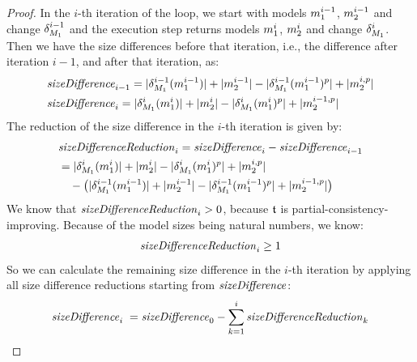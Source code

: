 \begin{proof}
    In the $i$-th iteration of the loop, we start with models $\model{m}{1}^{i-1}$, $\model{m}{2}^{i-1}$ and change $\change{\metamodel{M}{1}}^{i-1}$ and the execution step returns models $\model{m}{1}^{i}$, $\model{m}{2}^{i}$ and change $\change{\metamodel{M}{1}}^{i}$.
    Then we have the size differences before that iteration, i.e., the difference after iteration $i-1$, and after that iteration, as:
    \begin{align*}
        &
        \mathvariable{sizeDifference}_{i-1} = \abs{\change{\metamodel{M}{1}}^{i-1}(\model{m}{1}^{i-1})} + \abs{\model{m}{2}^{i-1}} - \abs{\change{\metamodel{M}{1}}^{i-1}(\model{m}{1}^{i-1})^p} + \abs{\model{m}{2}^{i, p}} \\
        &
        \mathvariable{sizeDifference}_{i} = \abs{\change{\metamodel{M}{1}}^{i}(\model{m}{1}^{i})} + \abs{\model{m}{2}^{i}} - \abs{\change{\metamodel{M}{1}}^{i}(\model{m}{1}^{i})^p} + \abs{\model{m}{2}^{i-1,p}}
    \end{align*}
    The reduction of the size difference in the $i$-th iteration is given by:
    \begin{align*}
        & 
        \mathvariable{sizeDifferenceReduction}_{i} = \mathvariable{sizeDifference}_{i} - \mathvariable{sizeDifference}_{i-1} \\
        & 
        = \abs{\change{\metamodel{M}{1}}^{i}(\model{m}{1}^{i})} + \abs{\model{m}{2}^{i}} - \abs{\change{\metamodel{M}{1}}^{i}(\model{m}{1}^{i})^p} + \abs{\model{m}{2}^{i,p}} \\
        & \formulaskip
        - \big(\abs{\change{\metamodel{M}{1}}^{i-1}(\model{m}{1}^{i-1})} + \abs{\model{m}{2}^{i-1}} - \abs{\change{\metamodel{M}{1}}^{i-1}(\model{m}{1}^{i-1})^p} + \abs{\model{m}{2}^{i-1,p}}\big)
    \end{align*}
    We know that $\mathit{sizeDifferenceReduction}_{i} > 0$, because $\transformation{t}$ is partial-consistency-improving. %
    Because of the model sizes being natural numbers, we know:
    \begin{align*}
        \mathit{sizeDifferenceReduction}_{i} \geq 1
    \end{align*}
    So we can calculate the remaining size difference in the $i$-th iteration by applying all size difference reductions starting from $\mathit{sizeDifference}$:
    \begin{align*}
        \mathvariable{sizeDifference}_{i} \; & 
        =  \mathvariable{sizeDifference}_{0} - \sum_{k=1}^{i} \mathvariable{sizeDifferenceReduction}_{k} \\

\end{align*}
\end{proof}
